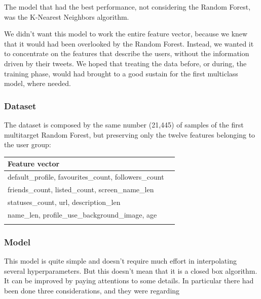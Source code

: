The model that had the best performance, not considering the Random Forest, was the K-Nearest Neighbors algorithm.

We didn't want this model to work the entire feature vector, because we knew that it would had been overlooked by the Random Forest. Instead, we wanted it to concentrate on the features that describe the users, without the information driven by their tweets.
We hoped that treating the data before, or during, the training phase, would had brought to 
a good sustain for the first multiclass model, where needed.

\subsubsection{Dataset}
The dataset is composed by the same number (21,445) of samples of the first multitarget Random Forest, but preserving only the twelve features belonging to the user group:

\small
\begin{center}
	\begin{tabular}{ll}
		\\Feature vector\\
		\hline\hline
		default\_profile, favourites\_count, followers\_count\\
		friends\_count, listed\_count, screen\_name\_len\\
		statuses\_count, url, description\_len\\
		name\_len, profile\_use\_background\_image, age\\\hline\\
	\end{tabular}
\end{center}
\normalsize

\subsubsection{Model}

This model is quite simple and doesn't require much effort in interpolating several hyperparameters. But this doesn't mean that it is a closed box algorithm. It can be improved by paying attentions to some details. In particular there had been done three considerations, and they were regarding

